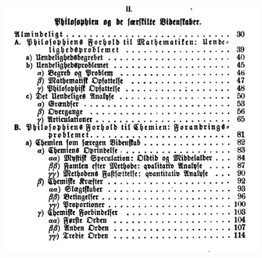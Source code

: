 \documentclass[ignorenonframetext, ]{beamer}
\begin{document}
\begin{frame}

\begin{figure}
\centering
\includegraphics[scale=0.65]{prop2.jpg}
\end{figure}
\end{frame}
\end{document}

